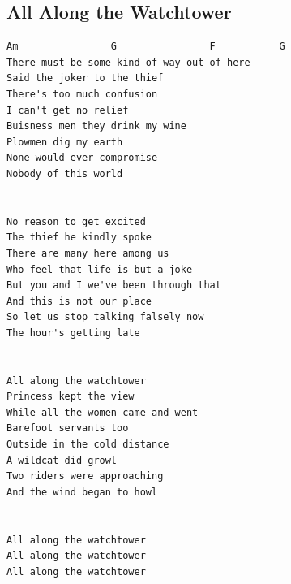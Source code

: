 \documentclass[a4paper]{article}
\begin{document}
\subsection{All Along the Watchtower} %
\label{sub:All Along the Watchtower}
\begin{Verbatim}[commandchars=\\\{\}]
	  Am                G                F           G 
There must be some kind of way out of here
Said the joker to the thief
There's too much confusion
I can't get no relief
Buisness men they drink my wine
Plowmen dig my earth
None would ever compromise
Nobody of this world


No reason to get excited
The thief he kindly spoke
There are many here among us
Who feel that life is but a joke
But you and I we've been through that
And this is not our place
So let us stop talking falsely now
The hour's getting late


All along the watchtower
Princess kept the view
While all the women came and went
Barefoot servants too
Outside in the cold distance
A wildcat did growl
Two riders were approaching
And the wind began to howl


All along the watchtower
All along the watchtower
All along the watchtower
\end{Verbatim}
\newpage
\end{document}
